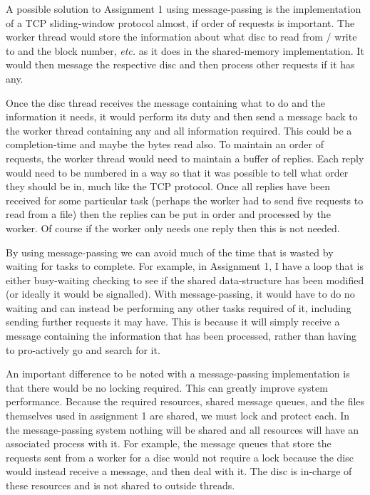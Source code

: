 \documentclass[12pt]{article}
\begin{document}
A possible solution to Assignment 1 using message-passing is the implementation of a TCP sliding-window protocol almost, if order of requests is important. The worker thread would store the information about what disc to read from / write to and the block number, \emph{etc.} as it does in the shared-memory implementation. It would then message the respective disc and then process other requests if it has any. 

Once the disc thread receives the message containing what to do and the information it needs, it would perform its duty and then send a message back to the worker thread containing any and all information required. This could be a completion-time and maybe the bytes read also. To maintain an order of requests, the worker thread would need to maintain a buffer of replies. Each reply would need to be numbered in a way so that it was possible to tell what order they should be in, much like the TCP protocol. Once all replies have been received for some particular task (perhaps the worker had to send five requests to read from a file) then the replies can be put in order and processed by the worker. Of course if the worker only needs one reply then this is not needed. 

By using message-passing we can avoid much of the time that is wasted by waiting for tasks to complete. For example, in Assignment 1, I have a loop that is either busy-waiting checking to see if the shared data-structure has been modified (or ideally it would be signalled). With message-passing, it would have to do no waiting and can instead be performing any other tasks required of it, including sending further requests it may have. This is because it will simply receive a message containing the information that has been processed, rather than having to pro-actively go and search for it.

An important difference to be noted with a message-passing implementation is that there would be no locking required. This can greatly improve system performance. Because the required resources, shared message queues, and the files themselves used in assignment 1 are shared, we must lock and protect each. In the message-passing system nothing will be shared and all resources will have an associated process with it. For example, the message queues that store the requests sent from a worker for a disc would not require a lock because the disc would instead receive a message, and then deal with it. The disc is in-charge of these resources and is not shared to outside threads.
\end{document}
